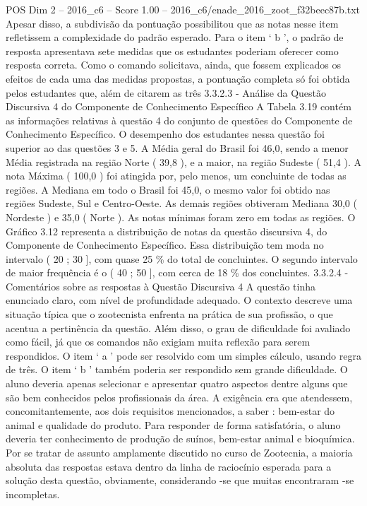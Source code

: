 \begin{textsample}{POS Dim 2 – 2016\_c6 – Score 1.00 – 2016\_c6/enade\_2016\_zoot\_f32beec87b.txt}
Apesar disso, a subdivisão da pontuação possibilitou que as notas nesse item refletissem a complexidade do padrão esperado.
Para o item ‘ b ’, o padrão de resposta apresentava sete medidas que os estudantes poderiam oferecer como resposta correta.
Como o comando solicitava, ainda, que fossem explicados os efeitos de cada uma das medidas propostas, a pontuação completa só foi obtida pelos estudantes que, além de citarem as três 3.3.2.3 - Análise da Questão Discursiva 4 do Componente de Conhecimento Específico A Tabela 3.19 contém as informações relativas à questão 4 do conjunto de questões do Componente de Conhecimento Específico.
O desempenho dos estudantes nessa questão foi superior ao das questões 3 e 5.
A Média geral do Brasil foi 46,0, sendo a menor Média registrada na região Norte ( 39,8 ), e a maior, na região Sudeste ( 51,4 ).
A nota Máxima ( 100,0 ) foi atingida por, pelo menos, um concluinte de todas as regiões.
A Mediana em todo o Brasil foi 45,0, o mesmo valor foi obtido nas regiões Sudeste, Sul e Centro-Oeste.
As demais regiões obtiveram Mediana 30,0 ( Nordeste ) e 35,0 ( Norte ).
As notas mínimas foram zero em todas as regiões.
O Gráfico 3.12 representa a distribuição de notas da questão discursiva 4, do Componente de Conhecimento Específico.
Essa distribuição tem moda no intervalo ( 20 ; 30 ], com quase 25 \% do total de concluintes.
O segundo intervalo de maior frequência é o ( 40 ; 50 ], com cerca de 18 \% dos concluintes. 3.3.2.4 - Comentários sobre as respostas à Questão Discursiva 4 A questão tinha enunciado claro, com nível de profundidade adequado.
O contexto descreve uma situação típica que o zootecnista enfrenta na prática de sua profissão, o que acentua a pertinência da questão.
Além disso, o grau de dificuldade foi avaliado como fácil, já que os comandos não exigiam muita reflexão para serem respondidos.
O item ‘ a ’ pode ser resolvido com um simples cálculo, usando regra de três.
O item ‘ b ’ também poderia ser respondido sem grande dificuldade.
O aluno deveria apenas selecionar e apresentar quatro aspectos dentre alguns que são bem conhecidos pelos profissionais da área.
A exigência era que atendessem, concomitantemente, aos dois requisitos mencionados, a saber : bem-estar do animal e qualidade do produto.
Para responder de forma satisfatória, o aluno deveria ter conhecimento de produção de suínos, bem-estar animal e bioquímica.
Por se tratar de assunto amplamente discutido no curso de Zootecnia, a maioria absoluta das respostas estava dentro da linha de raciocínio esperada para a solução desta questão, obviamente, considerando -se que muitas encontraram -se incompletas.

\end{textsample}

